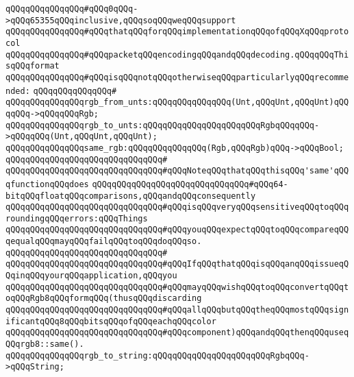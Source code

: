 \verb|qQQqqQQqqQQqqQQq#qQQq0qQQq->qQQq65355qQQqinclusive,qQQqsoqQQqweqQQqsupport|\newline
\verb|qQQqqQQqqQQqqQQq#qQQqthatqQQqforqQQqimplementationqQQqofqQQqXqQQqprotocol|\newline
\verb|qQQqqQQqqQQqqQQq#qQQqpacketqQQqencodingqQQqandqQQqdecoding.qQQqqQQqThisqQQqformat|\newline
\verb|qQQqqQQqqQQqqQQq#qQQqisqQQqnotqQQqotherwiseqQQqparticularlyqQQqrecommended:|\newline
\verb|qQQqqQQqqQQqqQQq#|\newline
\verb|qQQqqQQqqQQqqQQqrgb_from_unts:qQQqqQQqqQQqqQQq(Unt,qQQqUnt,qQQqUnt)qQQqqQQq->qQQqqQQqRgb;|\newline
\verb|qQQqqQQqqQQqqQQqrgb_to_unts:qQQqqQQqqQQqqQQqqQQqqQQqRgbqQQqqQQq->qQQqqQQq(Unt,qQQqUnt,qQQqUnt);|\newline
\newline
\verb|qQQqqQQqqQQqqQQqsame_rgb:qQQqqQQqqQQqqQQq(Rgb,qQQqRgb)qQQq->qQQqBool;|\newline
\verb|qQQqqQQqqQQqqQQqqQQqqQQqqQQqqQQq#|\newline
\verb|qQQqqQQqqQQqqQQqqQQqqQQqqQQqqQQq#qQQqNoteqQQqthatqQQqthisqQQq'same'qQQqfunctionqQQqdoes|\newline
\verb|qQQqqQQqqQQqqQQqqQQqqQQqqQQqqQQq#qQQq64-bitqQQqfloatqQQqcomparisons,qQQqandqQQqconsequently|\newline
\verb|qQQqqQQqqQQqqQQqqQQqqQQqqQQqqQQq#qQQqisqQQqveryqQQqsensitiveqQQqtoqQQqroundingqQQqerrors:qQQqThings|\newline
\verb|qQQqqQQqqQQqqQQqqQQqqQQqqQQqqQQq#qQQqyouqQQqexpectqQQqtoqQQqcompareqQQqequalqQQqmayqQQqfailqQQqtoqQQqdoqQQqso.|\newline
\verb|qQQqqQQqqQQqqQQqqQQqqQQqqQQqqQQq#|\newline
\verb|qQQqqQQqqQQqqQQqqQQqqQQqqQQqqQQq#qQQqIfqQQqthatqQQqisqQQqanqQQqissueqQQqinqQQqyourqQQqapplication,qQQqyou|\newline
\verb|qQQqqQQqqQQqqQQqqQQqqQQqqQQqqQQq#qQQqmayqQQqwishqQQqtoqQQqconvertqQQqtoqQQqRgb8qQQqformqQQq(thusqQQqdiscarding|\newline
\verb|qQQqqQQqqQQqqQQqqQQqqQQqqQQqqQQq#qQQqallqQQqbutqQQqtheqQQqmostqQQqsignificantqQQq8qQQqbitsqQQqofqQQqeachqQQqcolor|\newline
\verb|qQQqqQQqqQQqqQQqqQQqqQQqqQQqqQQq#qQQqcomponent)qQQqandqQQqthenqQQquseqQQqrgb8::same().|\newline
\newline
\verb|qQQqqQQqqQQqqQQqrgb_to_string:qQQqqQQqqQQqqQQqqQQqqQQqRgbqQQq->qQQqString;|\newline
